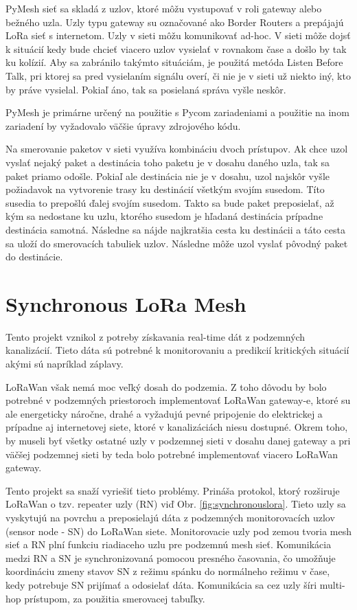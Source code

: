 \documentclass[slovak,master]{diploma}
\begin{document}
PyMesh sieť sa skladá z uzlov, ktoré môžu vystupovať v roli gateway alebo bežného uzla. Uzly typu gateway su označované ako Border Routers a prepájajú LoRa sieť s 
internetom. Uzly v sieti môžu komunikovať ad-hoc. V sieti môže dojsť k situácií kedy bude chcieť viacero uzlov vysielať v rovnakom čase a došlo by tak ku kolízií.
Aby sa zabránilo takýmto situáciám, je použitá metóda Listen Before Talk, pri ktorej sa pred vysielaním signálu overí, či nie je v sieti už niekto iný, kto by práve 
vysielal. Pokiaľ áno, tak sa posielaná správa vyšle neskôr.

PyMesh je primárne určený na použitie s Pycom zariadeniami a použitie na inom zariadení by vyžadovalo väčšie úpravy zdrojového kódu.

Na smerovanie paketov v sieti využíva kombináciu dvoch prístupov. Ak chce uzol vyslať nejaký paket a destinácia toho paketu je v dosahu daného uzla, tak sa paket priamo odošle. 
Pokiaľ ale destinácia nie je v dosahu, uzol najskôr vyšle požiadavok na vytvorenie trasy ku destinácií všetkým svojím susedom. Títo susedia to prepošlú ďalej svojím susedom. 
Takto sa bude paket preposielať, až kým sa nedostane ku uzlu, ktorého susedom je hľadaná destinácia prípadne destinácia samotná. Následne sa nájde najkratšia cesta ku destinácii a táto cesta sa uloží do smerovacích 
tabuliek uzlov. Následne môže uzol vyslať pôvodný paket do destinácie.



\section{Synchronous LoRa Mesh}
Tento projekt\cite{synchronouslorameshnetwork} vznikol z potreby získavania real-time dát z podzemných kanalizácií. Tieto dáta sú potrebné k monitorovaniu a predikcií kritických situácií akými 
sú napríklad záplavy.

LoRaWan však nemá moc veľký dosah do podzemia. Z toho dôvodu by bolo potrebné v podzemných priestoroch implementovať LoRaWan gateway-e, ktoré su ale energeticky náročne, drahé a vyžadujú 
pevné pripojenie do elektrickej a prípadne aj internetovej siete, ktoré v kanalizáciách niesu dostupné. Okrem toho, by museli byť všetky ostatné uzly v podzemnej sieti v dosahu danej gateway a pri väčšej podzemnej sieti 
by teda bolo potrebné implementovať viacero LoRaWan gateway.

Tento projekt sa snaží vyriešiť tieto problémy. Prináša protokol, ktorý rozširuje LoRaWan o tzv. repeater uzly (RN) viď Obr. \ref{fig:synchronouslora}. Tieto uzly sa vyskytujú na povrchu a preposielajú dáta z 
podzemných monitorovacích uzlov (sensor node  - SN) do LoRaWan siete. Monitorovacie uzly pod zemou tvoria mesh sieť a RN plní funkciu riadiaceho uzlu pre podzemnú mesh sieť. 
Komunikácia medzi RN a SN je synchronizovaná pomocou presného časovania, čo umožňuje koordináciu zmeny stavov SN z režimu spánku do normálneho režimu v čase, kedy 
potrebuje SN prijímať a odosielať dáta. Komunikácia sa cez uzly šíri multi-hop prístupom, za použitia smerovacej tabuľky.
\end{document}
